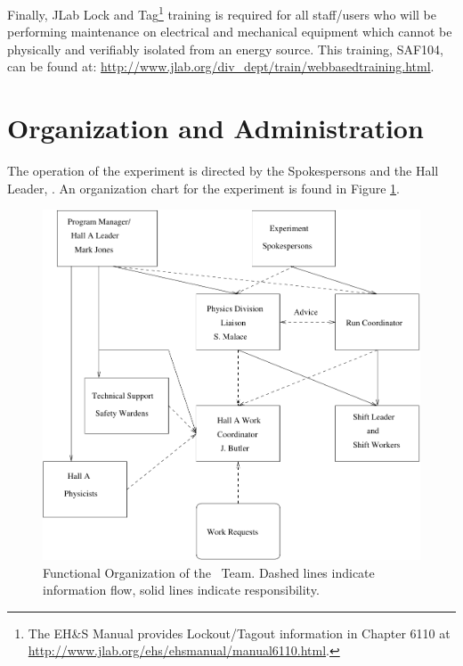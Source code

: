 \documentclass[10pt]{article}
\begin{document}
Finally, JLab Lock and Tag\footnote{The EH\&S Manual provides Lockout/Tagout
information in Chapter 6110 at \url{http://www.jlab.org/ehs/ehsmanual/manual6110.html}.}
training is required for all staff/users who will be
performing maintenance on electrical and mechanical equipment which  
cannot be physically and verifiably isolated from an energy
source.   This training, SAF104, can be found at:   \newline
\url{http://www.jlab.org/div_dept/train/webbasedtraining.html}.



\section{ Organization  and Administration}

The operation of the experiment is directed by the Spokespersons and the Hall 
Leader, \HALLLEADER. An organization chart for the experiment is
found in Figure \ref{HALLCHART}.

\begin{figure}
\includegraphics[width=\textwidth]{coo_HallAorg}
%
%
%
%
\caption[Dummy caption.]{Functional Organization of the \HALL\ Team. Dashed
lines indicate information flow, solid lines indicate responsibility.}
\label{HALLCHART} 
\end{figure}
\end{document}
